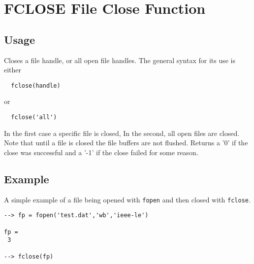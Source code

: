 \section{FCLOSE File Close Function}

\subsection{Usage}

Closes a file handle, or all open file handles.  The general syntax
for its use is either
\begin{verbatim}
  fclose(handle)
\end{verbatim}
or
\begin{verbatim}
  fclose('all')
\end{verbatim}
In the first case a specific file is closed,  In the second, all open
files are closed.  Note that until a file is closed the file buffers
are not flushed.  Returns a '0' if the close was successful and a '-1' if
the close failed for some reason.
\subsection{Example}

A simple example of a file being opened with \verb|fopen| and then closed with \verb|fclose|.
\begin{verbatim}
--> fp = fopen('test.dat','wb','ieee-le')

fp = 
 3 

--> fclose(fp)
\end{verbatim}
